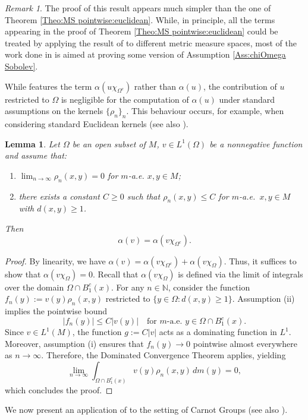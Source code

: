 \documentclass[reqno,11pt]{amsart}
\numberwithin{equation}{section}
\theoremstyle{definition} %
\theoremstyle{plain}
\newtheorem{lemma}[lemma]{Lemma}
\theoremstyle{definition}
\theoremstyle{remark}
\newtheorem{remark}[remark]{Remark}
\def\O{\Omega}
\begin{document}
\begin{remark}
    The proof of this result appears much simpler than the one of Theorem \ref{Theo:MS pointwise:euclidean}. While, in principle, all the terms appearing in the proof of Theorem \ref{Theo:MS pointwise:euclidean} could be treated by applying the result of \cite{HanPinamontiXu2025} to different metric measure spaces, most of the work done in  is aimed at proving some version of Assumption \ref{Ass:chiOmega Sobolev}.
\end{remark}

While  features the term $\alpha(u\chi_{\O^c})$ rather than $\alpha(u)$, the contribution of $u$ restricted to $\Omega$ is negligible for the computation of $\alpha(u)$ under standard assumptions on the kernels $\{\rho_n\}_n$. This behaviour occurs, for example, when considering standard Euclidean kernels (see also \cite[Corollary 2.5]{DaDfGioPi-Necess&Suff}).

\begin{lemma}\label{lem:vanishing_contribution}
    Let $\Omega$ be an open subset of $M$, $v \in L^1(\Omega)$ be a nonnegative function and assume that:
    \begin{enumerate}[label=(\roman*)]
        \item $\lim_{n\to\infty} \rho_n(x,y) = 0$ for $m$-a.e. $x,y \in M$;
        \item there exists a constant $C \ge 0$ such that $\rho_n(x,y) \leq C$ for $m$-a.e.\ $x,y \in M$ with $d(x,y) \geq 1$.
    \end{enumerate}
    Then
    \[
        \alpha(v) = \alpha(v\chi_{\Omega^c}).
    \]
\end{lemma}

\begin{proof}
    By linearity, we have $\alpha(v) = \alpha(v\chi_{\Omega^c}) + \alpha(v\chi_{\Omega})$. Thus, it suffices to show that $\alpha(v\chi_{\Omega}) = 0$.
    Recall that $\alpha(v\chi_{\Omega})$ is defined via the limit of integrals over the domain $\Omega \cap B_1^c(x)$.
    For any $n \in \mathbb{N}$, consider the function $f_n(y) := v(y)\rho_n(x,y)$ restricted to $\{y \in \Omega : d(x,y) \ge 1\}$.
    Assumption (ii) implies the pointwise bound
    \[
        |f_n(y)| \leq C |v(y)| \quad \text{for } m\text{-a.e. } y \in \Omega \cap B_1^c(x).
    \]
    Since $v \in L^1(M)$, the function $g := C|v|$ acts as a dominating function in $L^1$. 
    Moreover, assumption (i) ensures that $f_n(y) \to 0$ pointwise almost everywhere as $n \to \infty$. 
    Therefore, the Dominated Convergence Theorem applies, yielding
    \[
        \lim_{n\to\infty} \int_{\Omega \cap B_1^c(x)} v(y)\rho_n(x,y) \, dm(y) = 0,
    \]
    which concludes the proof.
\end{proof}
We now present an application of  to the setting of Carnot Groups (see also \cite{FracLaplacianCarnot}).
\end{document}
